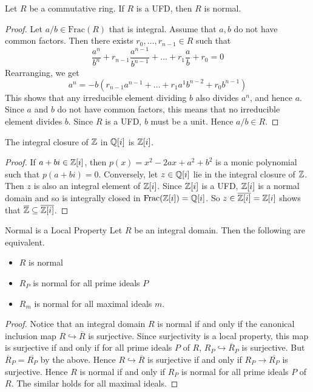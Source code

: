 \documentclass[a4paper]{article}
\begin{document}
\begin{prp}{}{} Let $R$ be a commutative ring. If $R$ is a UFD, then $R$ is normal. 
\begin{proof}
Let $a/b\in\text{Frac}(R)$ that is integral. Assume that $a,b$ do not have common factors. Then there exists $r_0,\dots,r_{n-1}\in R$ such that $$\frac{a^n}{b^n}+r_{n-1}\frac{a^{n-1}}{b^{n-1}}+\dots+r_1\frac{a}{b}+r_0=0$$ Rearranging, we get $$a^n=-b\left(r_{n-1}a^{n-1}+\dots+r_1a^1b^{n-2}+r_0b^{n-1}\right)$$ This shows that any irreducible element dividing $b$ also divides $a^n$, and hence $a$. Since $a$ and $b$ do not have common factors, this means that no irreducible element divides $b$. Since $R$ is a UFD, $b$ must be a unit. Hence $a/b\in R$. 
\end{proof}
\end{prp}

\begin{eg}{}{} The integral closure of $\mathbb{Z}$ in $\mathbb{Q}[i]$ is $\mathbb{Z}[i]$. 
\begin{proof}
If $a+bi\in\mathbb{Z}[i]$, then $p(x)=x^2-2ax+a^2+b^2$ is a monic polynomial such that $p(a+bi)=0$. Conversely, let $z\in\mathbb{Q}[i]$ lie in the integral closure of $\mathbb{Z}$. Then $z$ is also an integral element of $\mathbb{Z}[i]$. Since $\mathbb{Z}[i]$ is a UFD, $\mathbb{Z}[i]$ is a normal domain and so is integrally closed in $\text{Frac}(\mathbb{Z}[i])=\mathbb{Q}[i]$. So $z\in\overline{\mathbb{Z}[i]}=\mathbb{Z}[i]$ shows that $\overline{\mathbb{Z}}\subseteq\overline{\mathbb{Z}[i]}$. 
\end{proof}
\end{eg}

\begin{prp}{Normal is a Local Property}{} Let $R$ be an integral domain. Then the following are equivalent. 
\begin{itemize}
\item $R$ is normal
\item $R_P$ is normal for all prime ideals $P$
\item $R_m$ is normal for all maximal ideals $m$. 
\end{itemize} 
\begin{proof}
Notice that an integral domain $R$ is normal if and only if the canonical inclusion map $R\hookrightarrow\overline{R}$ is surjective. Since surjectivity is a local property, this map is surjective if and only if for all prime ideals $P$ of $R$, $R_P\hookrightarrow\overline{R}_P$ is surjective. But $\overline{R}_P=\overline{R_P}$ by the above. Hence $R\hookrightarrow\overline{R}$ is surjective if and only if $R_P\to\overline{R_P}$ is surjective. Hence $R$ is normal if and only if $R_P$ is normal for all prime ideals $P$ of $R$. The similar holds for all maximal ideals. 
\end{proof}
\end{prp}
\end{document}
